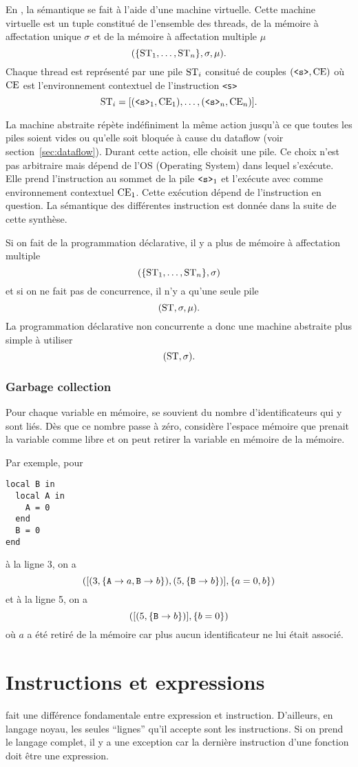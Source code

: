 En \oz{}, la sémantique se fait à l'aide d'une machine virtuelle.
Cette machine virtuelle est un tuple constitué de l'ensemble des
threads, de la mémoire à affectation unique $\sigma$ et de la mémoire
à affectation multiple $\mu$
\[ (\{\mathrm{ST}_1, \ldots, \mathrm{ST}_n\}, \sigma, \mu). \]
Chaque thread est représenté par une pile $\mathrm{ST}_i$ consitué de couples
$(\verb|<s>|, \ce)$ où $\mathrm{CE}$ est l'environnement contextuel
de l'instruction \lstinline|<s>|
\[ \st_i = [(\verb|<s>|_1, \ce_1), \ldots, (\verb|<s>|_n, \ce_n)]. \]

La machine abstraite répète indéfiniment la même action jusqu'à ce
que toutes les piles soient vides ou qu'elle soit bloquée à cause du
dataflow (voir section~\ref{sec:dataflow}).
Durant cette action, elle choisit une pile.
Ce choix n'est pas arbitraire mais dépend de l'OS (Operating System) dans
lequel \mozart{} s'exécute.
Elle prend l'instruction au sommet de la pile $\verb|<s>|_1$ et l'exécute
avec comme environnement contextuel $\mathrm{CE}_1$.
Cette exécution dépend de l'instruction en question.
La sémantique des différentes instruction est donnée dans la suite de cette
synthèse.

Si on fait de la programmation déclarative, il y a plus de mémoire à
affectation multiple
\[ (\{\mathrm{ST}_1, \ldots, \mathrm{ST}_n\}, \sigma) \]
et si on ne fait pas de concurrence, il n'y a qu'une seule pile
\[ (\mathrm{ST}, \sigma, \mu). \]
La programmation déclarative non concurrente a donc une machine abstraite
plus simple à utiliser
\[ (\mathrm{ST}, \sigma). \]

\subsubsection{Garbage collection}
Pour chaque variable en mémoire,
\oz{} se souvient du nombre d'identificateurs qui y sont liés.
Dès que ce nombre passe à zéro, \oz{} considère l'espace mémoire que
prenait la variable comme libre et on peut retirer la variable en mémoire
de la mémoire.

Par exemple, pour
\begin{lstlisting}
local B in
  local A in
    A = 0
  end
  B = 0
end
\end{lstlisting}
à la ligne 3, on a
\[ ([(3,\{\verb|A|\to a, \verb|B|\to b\}),
(5,\{\verb|B|\to b\})],\{a = 0, b\}) \]
et à la ligne 5, on a
\[ ([(5,\{\verb|B|\to b\})],\{b = 0\}) \]
où $a$ a été retiré de la mémoire car plus aucun identificateur ne
lui était associé.

\section{Instructions et expressions}
\label{sec:sv}
\oz{} fait une différence fondamentale entre expression et instruction.
D'ailleurs, en langage noyau, les seules ``lignes''
qu'il accepte sont les instructions.
Si on prend le langage complet,
il y a une exception car
la dernière instruction d'une fonction doit être une expression.

